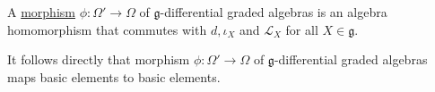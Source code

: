 \begin{defn} 
	A \underline{morphism} $\phi : \Omega' \to \Omega$ of
	$\mathfrak{g}$-differential graded algebras is an algebra homomorphism that
	commutes with  $d,\iota_X$ and  $\mathcal{L}_X$ for all $X\in\mathfrak{g}$.
\end{defn}
It follows directly that 
morphism $\phi : \Omega'\to \Omega$ of $\mathfrak{g}$-differential graded
algebras maps basic elements to basic elements.

\begin{comment} %
\begin{defn}
	A differential form $\alpha\in\Omega(P,V)$ on a principal $G$-bundle  with 
	representation $(V,\rho)$ is \underline{$\rho$-equivariant}   
	if for every $g\in G$, $r_g^*\alpha = \rho(g^{-1})\alpha$. 
	\\
	A differential form $\alpha\in\Omega(P,V)$ on a principal $G$-bundle  with 
	representation $(V,\rho)$ is \underline{basic}  
	if it is horizontal and $\rho$-equivariant. This subspace is
	denoted $\Omega_{bas}(P,V)$.
\end{defn}
Let $P$ be a principle $G$-bundle, and let ($V,\rho$) be a representation of
$G$. Let $E= P\times_\rho V$ be the associated bundle.
\begin{thm} %
	The map $\Omega_{bas}^k(P,V) \to \Omega^k(M,P\times_\rho V)$ given by 
	$\omega \mapsto \alpha_x = f_p \circ \omega_p$
	is a linear isomorphism, where $f_p: V\to E_x$ is the isomorphism  $v\mapsto
	[p,v]$, and $p\in\pi^{-1}(x)$ is any point.
\end{thm}

\begin{cor} %
	There is a natural isomorphism between $\Gamma(M,P\times_\rho V)$ and
	$\rho$-equivariant maps in
	$C^{\infty}(P,V)$, given by sending $s\in C^{\infty}(P,V)^G$ to $s_M$
	defined by  $s_M(x) = [p,s(p)]$, where  $p\in\pi^{-1}(x)$ is any element.
\end{cor}


Recall that a \underline{vertical vector} on a fibre bundle $E$ with base  $M$
is a tangent vector  $X\in TE$ such that  $X(\pi^* f) = 0$ for any  $f\in
C^\infty(M)$. The space $V_pP$ of vertical tangent vectors to a point $p$ in a
principal $G$-bundle can be canonically identified with the Lie algebra $\mathfrak{g}$ 
of $G$ in the following way. 
If $X\in\mathfrak{g}$, the \underline{fundamental vector field} associated to
$X$, denoted $X_P \in \Gamma(VP)$, is
 \[
X_P = \odv{}{t}_{t=0} p \exp (t X)
\] 
This is a vertical vector field because $X_P(\pi^*f) = \odv{}{t}_{t=0} f(p \exp
(t X)) = 0$. 
\end{comment}


